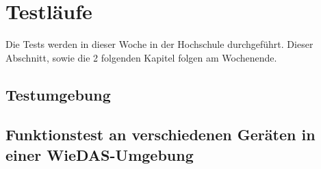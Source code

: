 \section{Testläufe}
\label{imp_test}

Die Tests werden in dieser Woche in der Hochschule durchgeführt.
Dieser Abschnitt, sowie die 2 folgenden Kapitel folgen am Wochenende.

\subsection{Testumgebung}
\label{imp_test_env}

\subsection{Funktionstest an verschiedenen Geräten in einer WieDAS-Umgebung}
\label{imp_test_dev}
